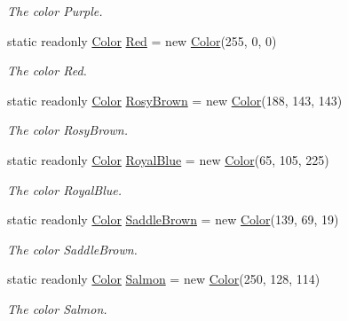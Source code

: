 \begin{DoxyCompactItemize}
\begin{DoxyCompactList}\small\item\em The color Purple. \end{DoxyCompactList}\item 
static readonly \hyperlink{struct_tri_devs_1_1_tri_engine2_d_1_1_color}{Color} \hyperlink{struct_tri_devs_1_1_tri_engine2_d_1_1_color_ab879f9bfa08935879d4b9879dcb32495}{Red} = new \hyperlink{struct_tri_devs_1_1_tri_engine2_d_1_1_color}{Color}(255, 0, 0)
\begin{DoxyCompactList}\small\item\em The color Red. \end{DoxyCompactList}\item 
static readonly \hyperlink{struct_tri_devs_1_1_tri_engine2_d_1_1_color}{Color} \hyperlink{struct_tri_devs_1_1_tri_engine2_d_1_1_color_a0273800b7d32bf08b982beb95f9e6dd6}{Rosy\-Brown} = new \hyperlink{struct_tri_devs_1_1_tri_engine2_d_1_1_color}{Color}(188, 143, 143)
\begin{DoxyCompactList}\small\item\em The color Rosy\-Brown. \end{DoxyCompactList}\item 
static readonly \hyperlink{struct_tri_devs_1_1_tri_engine2_d_1_1_color}{Color} \hyperlink{struct_tri_devs_1_1_tri_engine2_d_1_1_color_af560b006971ca8af57fa8ed0726494e2}{Royal\-Blue} = new \hyperlink{struct_tri_devs_1_1_tri_engine2_d_1_1_color}{Color}(65, 105, 225)
\begin{DoxyCompactList}\small\item\em The color Royal\-Blue. \end{DoxyCompactList}\item 
static readonly \hyperlink{struct_tri_devs_1_1_tri_engine2_d_1_1_color}{Color} \hyperlink{struct_tri_devs_1_1_tri_engine2_d_1_1_color_a903eb967599d999e64e05b4965bbd753}{Saddle\-Brown} = new \hyperlink{struct_tri_devs_1_1_tri_engine2_d_1_1_color}{Color}(139, 69, 19)
\begin{DoxyCompactList}\small\item\em The color Saddle\-Brown. \end{DoxyCompactList}\item 
static readonly \hyperlink{struct_tri_devs_1_1_tri_engine2_d_1_1_color}{Color} \hyperlink{struct_tri_devs_1_1_tri_engine2_d_1_1_color_aa389cb8ba4594b39f43ac81826d2054d}{Salmon} = new \hyperlink{struct_tri_devs_1_1_tri_engine2_d_1_1_color}{Color}(250, 128, 114)
\begin{DoxyCompactList}\small\item\em The color Salmon. \end{DoxyCompactList}\item 

\end{DoxyCompactItemize}

